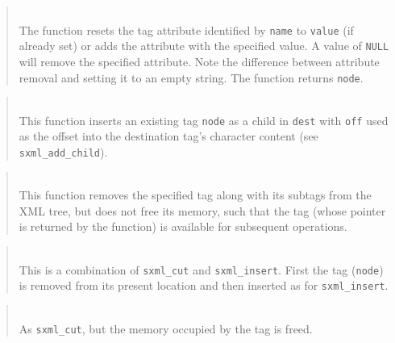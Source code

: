\begin{quote}
\noindent\hspace{-0.35in}{\tt sxml\_t sxml\_set\_attr[\_d] (sxml\_t node, const char *name, const char *value); }\\ \hspace{0in}
The function resets the tag attribute identified by {\tt name} to
{\tt value} (if already set)
or adds the attribute with the specified value.
A value of {\tt NULL} will remove the specified attribute.
Note the difference between attribute removal and setting it to an empty
string.
The function returns {\tt node}.
\end{quote}

\begin{quote}
\noindent\hspace{-0.35in}{\tt sxml\_t sxml\_insert (sxml\_t node, sxml\_t dest, size\_t off); }\\ \hspace{0in}
This function inserts an existing tag {\tt node} as a child in {\tt dest} with
{\tt off} used as the offset into the destination tag's character content
(see {\tt sxml\_add\_child}).
\end{quote}

\begin{quote}
\noindent\hspace{-0.35in}{\tt sxml\_t sxml\_cut (sxml\_t node); }\\ \hspace{0in}
This function removes the specified tag along with its subtags from the
XML tree, but does not free its memory, such that the tag (whose pointer is
returned by the function) is available for subsequent operations.
\end{quote}

\begin{quote}
\noindent\hspace{-0.35in}{\tt sxml\_t sxml\_move (sxml\_t node, sxml\_t dest, size\_t off); }\\ \hspace{0in}
This is a combination of {\tt sxml\_cut} and {\tt sxml\_insert}.
First the tag ({\tt node})
is removed from its present location and then inserted as
for {\tt sxml\_insert}.
\end{quote}

\begin{quote}
\noindent\hspace{-0.35in}{\tt void sxml\_remove (sxml\_t node); }\\ \hspace{0in}
As {\tt sxml\_cut}, but the memory occupied by the tag is freed.
\end{quote}

